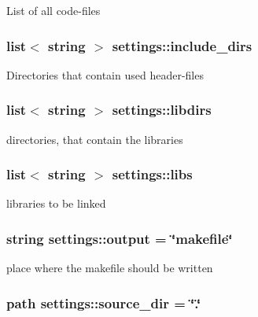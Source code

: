 List of all code-\/files \hypertarget{structsettings_a08e64a4b8389d43ddb5ac80a9c38b972}{
\subsubsection[{include\-\_\-dirs}]{\setlength{\rightskip}{0pt plus 5cm}list$<$ string $>$ settings\-::include\-\_\-dirs\hspace{0.3cm}{\ttfamily [static]}}}\label{structsettings_a08e64a4b8389d43ddb5ac80a9c38b972}
Directories that contain used header-\/files \hypertarget{structsettings_af61346ae2dab3f7390b28e0bf2375f4e}{
\subsubsection[{libdirs}]{\setlength{\rightskip}{0pt plus 5cm}list$<$ string $>$ settings\-::libdirs\hspace{0.3cm}{\ttfamily [static]}}}\label{structsettings_af61346ae2dab3f7390b28e0bf2375f4e}
directories, that contain the libraries \hypertarget{structsettings_a7c19b7fd03fe16661f946dbfc1417cb4}{
\subsubsection[{libs}]{\setlength{\rightskip}{0pt plus 5cm}list$<$ string $>$ settings\-::libs\hspace{0.3cm}{\ttfamily [static]}}}\label{structsettings_a7c19b7fd03fe16661f946dbfc1417cb4}
libraries to be linked \hypertarget{structsettings_a0ee03de4526f2243b1a8fccfe99021fc}{
\subsubsection[{output}]{\setlength{\rightskip}{0pt plus 5cm}string settings\-::output = \char`\"{}makefile\char`\"{}\hspace{0.3cm}{\ttfamily [static]}}}\label{structsettings_a0ee03de4526f2243b1a8fccfe99021fc}
place where the makefile should be written \hypertarget{structsettings_a60c9f664edda432102c9975131edfa1e}{
\subsubsection[{source\-\_\-dir}]{\setlength{\rightskip}{0pt plus 5cm}path settings\-::source\-\_\-dir = \char`\"{}.\char`\"{}\hspace{0.3cm}{\ttfamily [static]}}}\label{structsettings_a60c9f664edda432102c9975131edfa1e}
